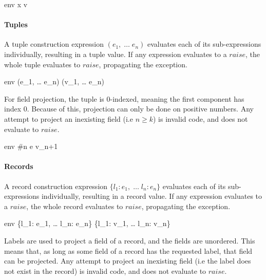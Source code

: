 \documentclass{article}
\begin{document}



    {\mbox{env} \vdash x \Downarrow v}


\paragraph{Tuples}
A tuple construction expression $(e_1, \; \dots \; e_n)$ evaluates each of its sub-expressions individually, resulting in a tuple value.
If any expression evaluates to a $raise$, the whole tuple evaluates to $raise$, propagating the exception.

    {\mbox{env} \vdash (e_1, \; \dots \; e_n) \Downarrow (v_1, \; \dots \; e_n)}

For field projection, the tuple is 0-indexed, meaning the first component has index 0.
Because of this, projection can only be done on positive numbers.
Any attempt to project an inexisting field (i.e $n \geq k$) is invalid code, and does not evaluate to $raise$.

    {\mbox{env} \vdash \#n \; e \Downarrow v_{n+1}}

\paragraph{Records}
A record construction expression $\{l_1: e_1, \; \dots \; l_n: e_n\}$ evaluates each of its sub-expressions individually, resulting in a record value.
If any expression evaluates to a $raise$, the whole record evaluates to $raise$, propagating the exception.

    {\mbox{env} \vdash \{l_1: e_1, \; \dots \; l_n: e_n\} \Downarrow \{l_1: v_1, \; \dots \; l_n: v_n\}}

Labels are used to project a field of a record, and the fields are unordered.
This means that, as long as some field of a record has the requested label, that field can be projected.
Any attempt to project an inexisting field (i.e the label does not exist in the record) is invalid code, and does not evaluate to $raise$.
\end{document}
